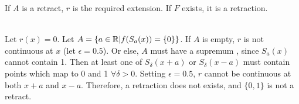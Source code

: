 \begin{solution}
 If $A$ is a retract, $r$ is the required extension. If $F$ exists, it is a retraction.
\end{solution}


\begin{solution}
 \\Let $r(x) = 0$. Let $A = \{a \in \mathbb{R}|f(S_a(x)) = \{0\}\}$. If $A$ is empty, $r$ is not continuous at $x$ (let $\epsilon = 0.5$). Or else, $A$ must have a supremum , since $S_a(x)$ cannot contain 1. Then at least one of $S_\delta(x+a)$ or $S_\delta(x-a)$ must contain points which map to 0 and 1 $\forall \delta > 0$. Setting $\epsilon = 0.5$, $r$ cannot be continuous at both $x+a$ and $x-a$. Therefore, a retraction does not exists, and $\{0,1\}$ is not a retract.
\end{solution}